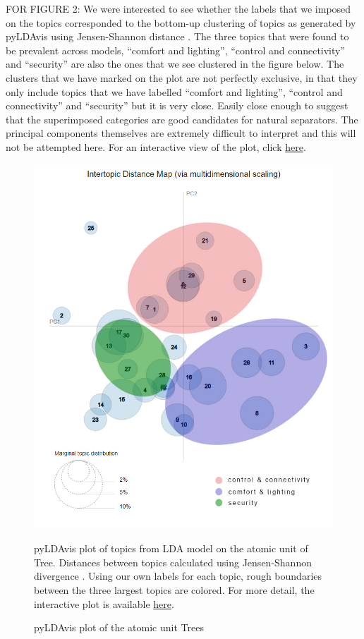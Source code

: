 \documentclass{article}
\begin{document}
    FOR FIGURE 2: 
    We were interested to see whether the labels that we imposed on the topics corresponded to the bottom-up clustering of topics as generated by pyLDAvis using Jensen-Shannon distance \cite{sievert2014ldavis}. The three topics that were found to be prevalent across models, “comfort and lighting”, “control and connectivity” and “security” are also the ones that we see clustered in the figure below. The clusters that we have marked on the plot are not perfectly exclusive, in that they only include topics that we have labelled “comfort and lighting”, “control and connectivity” and “security” but it is very close. Easily close enough to suggest that the superimposed categories are good candidates for natural separators. The principal components themselves are extremely difficult to interpret and this will not be attempted here. For an interactive view of the plot, click \href{https://tinyurl.com/y9ncgo5b}{here}.
    
    \begin{figure}[H]
        \begin{centering}
        \includegraphics[scale=0.4]{../Figure/pyLDAvis_edit.jpg}
        \caption{pyLDAvis plot of the atomic unit Trees}
        \end{centering}
        \begin{footnotesize} 
            pyLDAvis plot of topics from LDA model on the atomic unit of Tree. Distances between topics calculated using Jensen-Shannon divergence \cite{sievert2014ldavis}. Using our own labels for each topic, rough boundaries between the three largest topics are colored. For more detail, the interactive plot is available \href{https://tinyurl.com/y9ncgo5b}{here}.
        \end{footnotesize}
    \end{figure}
    
\end{document}
